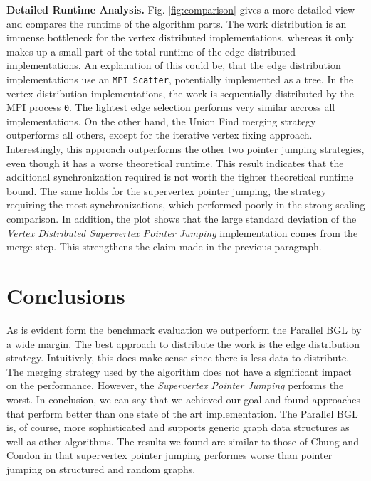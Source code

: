 \documentclass[letterpaper]{article}
\newcommand{\mypar}[1]{{\bf #1.}}
\begin{document}
\mypar{Detailed Runtime Analysis}
Fig. \ref{fig:comparison} gives a more detailed view and compares the runtime of the algorithm parts. The work
distribution is an immense bottleneck for the vertex distributed implementations, whereas it only makes up a small part
of the total runtime of the edge distributed implementations. An explanation of this could be, that the edge
distribution implementations use an \verb|MPI_Scatter|, potentially implemented as a tree. In the vertex distribution
implementations, the work is sequentially distributed by the MPI process \verb|0|. The lightest edge selection performs
very similar accross all implementations. On the other hand, the Union Find merging strategy outperforms all others,
except for the iterative vertex fixing approach. Interestingly, this approach outperforms the other two pointer jumping
strategies, even though it has a worse theoretical runtime. This result indicates that the additional synchronization
required is not worth the tighter theoretical runtime bound. The same holds for the supervertex pointer jumping, the
strategy requiring the most synchronizations, which performed poorly in the strong scaling comparison. In addition, the
plot shows that the large standard deviation of the \emph{Vertex Distributed Supervertex Pointer Jumping} implementation
comes from the merge step. This strengthens the claim made in the previous paragraph.

\section{Conclusions}
As is evident form the benchmark evaluation %
we outperform the Parallel BGL by a wide margin. The best approach to distribute the work is the edge distribution
strategy. Intuitively, this does make sense since there is less data to distribute. The merging strategy used by the
algorithm does not have a significant impact on the performance. However, the \emph{Supervertex Pointer Jumping} performs
the worst. In conclusion, we can say that we achieved our goal and found approaches that perform better than one state of
the art implementation. The Parallel BGL is, of course, more sophisticated and supports generic graph data structures as
well as other algorithms. The results we found are similar to those of Chung and Condon \cite{chung1996parallel} in that
supervertex pointer jumping performes worse than pointer jumping on structured and random graphs.
\end{document}
